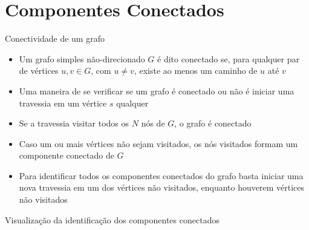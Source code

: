 \section{Componentes Conectados}

\begin{frame}[fragile]{Conectividade de um grafo}

    \begin{itemize}
        \item Um grafo simples não-direcionado $G$ é dito conectado se, para qualquer par de 
            vértices $u, v\in G$, com $u\neq v$, existe ao menos um caminho de $u$ até $v$

        \item Uma maneira de se verificar se um grafo é conectado ou não é iniciar uma travessia
            em um vértice $s$ qualquer

        \item Se a travessia visitar todos os $N$ nós de $G$, o grafo é conectado

        \item Caso um ou mais vértices não sejam visitados, os nós visitados formam um 
            componente conectado de $G$

        \item Para identificar todos os componentes conectados do grafo basta iniciar uma nova
            travessia em um dos vértices não visitados, enquanto houverem vértices não
            visitados
    \end{itemize}

\end{frame}

\begin{frame}[fragile]{Visualização da identificação dos componentes conectados}


\end{frame}

